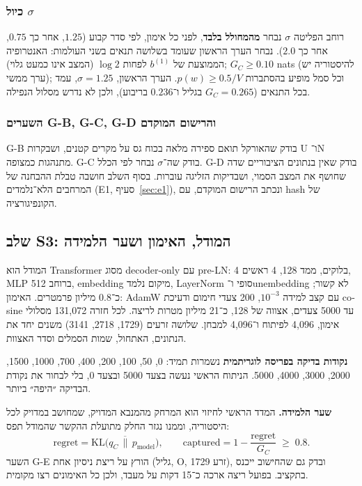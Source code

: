 \documentclass[12pt,a4paper]{article}
\newcommand{\en}[1]{\foreignlanguage{english}{#1}}   %
\newcommand{\bel}[1]{b^{(#1)}}
\newcommand{\GC}{G_{C}}
\newcommand{\KL}{\mathrm{KL}}
\begin{document}
\subsubsection{כיול $\sigma$}
רוחב הפליטה $\sigma$ נבחר \textbf{מהמחולל בלבד}, לפני כל אימון, לפי סדר קבוע ($1.25$, אחר כך $0.75$, אחר כך $2.0$). נבחר הערך הראשון שעומד בשלושה תנאים בשני העולמות: האנטרופיה הממוצעת של $\bel{1}$ לפחות $\log 2$ (המצב אינו כמעט גלוי); $\GC\ge0.10$ \en{nats} (להיסטוריה יש ערך ממשי); וכל סמל מופיע בהסתברות $p(w)\ge0.5/V$. הערך הראשון, $\sigma=1.25$, עמד בכל התנאים ($\GC=0.265$ בגליל ו־$0.236$ בריבוע), ולכן לא נדרש מסלול הנפילה.

\subsubsection{השערים \en{G-B}, \en{G-C}, \en{G-D} והרישום המוקדם}
\en{G-B} בודק שהאורקל תואם ספירה מלאה בכוח גס על מקרים קטנים, ושבקרות U ו־N מתנהגות כמצופה. \en{G-C} בודק שה־$\sigma$ נבחר לפי הכלל. \en{G-D} בודק שאין בנתונים הציבוריים שדה שחושף את המצב הסמוי, ושבדיקות הזליגה עוברות. בסוף השלב חושבה טבלת ההבחנה של המרחבים הלא־נלמדים (\en{E1}, סעיף~\ref{sec:e1}), ונכתב הרישום המוקדם, עם \en{hash} של הקונפיגורציה.

\subsection{שלב S3: המודל, האימון ושער הלמידה}
המודל הוא \en{Transformer} מסוג \en{decoder-only} עם \en{pre-LN}: 4 בלוקים, ממד 128, 4 ראשים, \en{MLP} ברוחב 512, \en{embedding} מיקום נלמד, \en{LayerNorm} סופי ו־\en{unembedding} לא קשור; כ־0.8 מיליון פרמטרים. האימון: \en{AdamW} עם קצב למידה $10^{-3}$, 200 צעדי חימום ודעיכת \en{cosine} עד 5000 צעדים, אצווה של 128, כ־21 מיליון מטרות לריצה. לכל חזרה 131,072 מסלולי אימון, 4,096 לפיתוח ו־4,096 למבחן. שלושה זרעים (1729, 2718, 3141) משנים יחד את הנתונים, האתחול, שמות הסמלים וסדר האצוות.

\textbf{נקודות בדיקה בפריסה לוגריתמית} נשמרות תמיד: 0, 50, 100, 200, 400, 700, 1000, 1500, 2000, 3000, 4000, 5000. הניתוח הראשי נעשה בצעד 5000 ובצעד 0, בלי לבחור את נקודת הבדיקה ״היפה״ ביותר.

\textbf{שער הלמידה.} המדד הראשי לחיזוי הוא המרחק מהמנבא המדויק, שמחושב במדויק לכל היסטוריה, וממנו נגזר החלק מתועלת ההקשר שהמודל תפס:
\begin{equation}
\mathrm{regret}=\overline{\KL\big(q_C\,\|\,p_{\mathrm{model}}\big)},\qquad
\mathrm{captured}=1-\frac{\mathrm{regret}}{\GC}\;\ge\;0.8 .
\end{equation}
השער \en{G-E} הורץ על ריצת ניסיון אחת (גליל, O, זרע 1729), ובדק גם שהחישוב ייכנס בתקציב. בפועל ריצה ארכה כ־15 דקות על מעבד, ולכן כל האימונים רצו מקומית.
\end{document}
